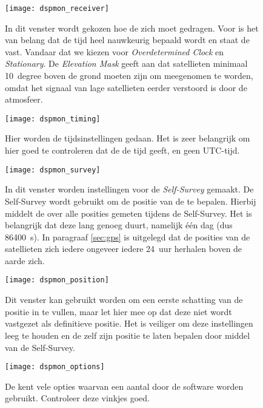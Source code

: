 \begin{figure}
    \centering
    \texttt{[image: dspmon\_receiver]}
    \caption{In dit venster wordt gekozen hoe de \gps zich moet gedragen.
    Voor \hisparc is het van belang dat de tijd heel nauwkeurig bepaald
    wordt en staat de \gps vast. Vandaar dat we kiezen voor
    \emph{Overdetermined Clock} en \emph{Stationary}. De \emph{Elevation
    Mask} geeft aan dat satellieten minimaal \SI{10}{ degree} boven de
    grond moeten zijn om meegenomen te worden, omdat het signaal van
    lage satellieten eerder verstoord is door de atmosfeer.}
    \label{fig:dspmon_receiver}
\end{figure}

\begin{figure}
    \centering
    \texttt{[image: dspmon\_timing]}
    \caption{Hier worden de tijdsinstellingen gedaan. Het is zeer
    belangrijk om hier goed te controleren dat de \gps de \gps tijd
    geeft, en geen UTC-tijd.}
    \label{fig:dspmon_timing}
\end{figure}

\begin{figure}
    \centering
    \texttt{[image: dspmon\_survey]}
    \caption{In dit venster worden instellingen voor de
             \emph{Self-Survey} gemaakt. De Self-Survey wordt gebruikt
             om de positie van de \gps te bepalen. Hierbij middelt de
             \gps over alle posities gemeten tijdens de Self-Survey. Het
             is belangrijk dat deze lang genoeg duurt, namelijk één dag
             (dus \SI{86400}{\second}). In paragraaf \ref{sec:gps} is
             uitgelegd dat de posities van de \gps satellieten zich
             iedere ongeveer iedere \SI{24}{uur} herhalen boven de aarde
             zich.}
    \label{fig:dspmon_survey}
\end{figure}
   
\begin{figure}
    \centering
    \texttt{[image: dspmon\_position]}
    \caption{Dit venster kan gebruikt worden om een eerste schatting van
    de positie in te vullen, maar let hier mee op dat deze niet wordt
    vastgezet als definitieve positie. Het is veiliger om deze
    instellingen leeg te houden en de \gps zelf zijn positie te laten
    bepalen door middel van de Self-Survey.}
    \label{fig:dspmon_position}
\end{figure}

\begin{figure}
    \centering
    \texttt{[image: dspmon\_options]}
    \caption{De \gps kent vele opties waarvan een aantal door de \hisparc
    software worden gebruikt. Controleer deze vinkjes goed.}
    \label{fig:dspmon_options}
\end{figure}

